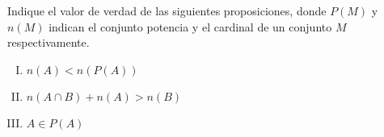 \noindent
Indique el valor de verdad de las siguientes proposiciones, donde $ P(M) $  y $ n(M) $ indican el conjunto potencia y el cardinal de un conjunto $M$ respectivamente.
\begin{enumerate}[I.]
	\item $ n(A)<n(P(A)) $
	\item $ n(A\cap B)+n(A)>n(B) $
	\item $ A\in P(A) $
\end{enumerate}
